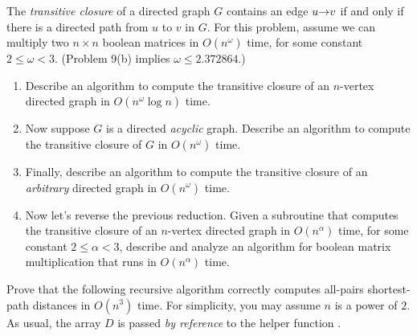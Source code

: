 \begin{exercises}
\item The \textit{transitive closure} of a directed graph $G$ contains an edge $u\mathord{\rightarrow}v$ if and only if there is a directed path from $u$ to $v$ in $G$.
For this problem, assume we can multiply two $n \times n$ boolean matrices in $O(n^\omega)$ time, for some constant $2 \le \omega < 3$. (Problem 9(b) implies $\omega \le 2.372864$.)
\begin{enumerate}
\item Describe an algorithm to compute the transitive closure of an $n$-vertex directed graph in $O(n^\omega \log n)$ time.
\item Now suppose $G$ is a directed \textit{acyclic} graph.
Describe an algorithm to compute the transitive closure of $G$ in $O(n^\omega)$ time. 
\item Finally, describe an algorithm to compute the transitive closure of an \textit{arbitrary} directed graph in $O(n^\omega)$ time. 
\item Now let’s reverse the previous reduction.
Given a subroutine  that computes the transitive closure of an $n$-vertex directed graph in $O(n^\alpha)$ time, for some constant $2 \le \alpha < 3$, describe and analyze an algorithm for boolean matrix multiplication that runs in $O(n^\alpha)$ time.
\end{enumerate}

\item Prove that the following recursive algorithm correctly computes all-pairs shortest-path distances in $O(n^3)$ time.
For simplicity, you may assume $n$ is a power of $2$.
As usual, the array $D$ is passed \textit{by reference} to the helper function . 


\end{exercises}
